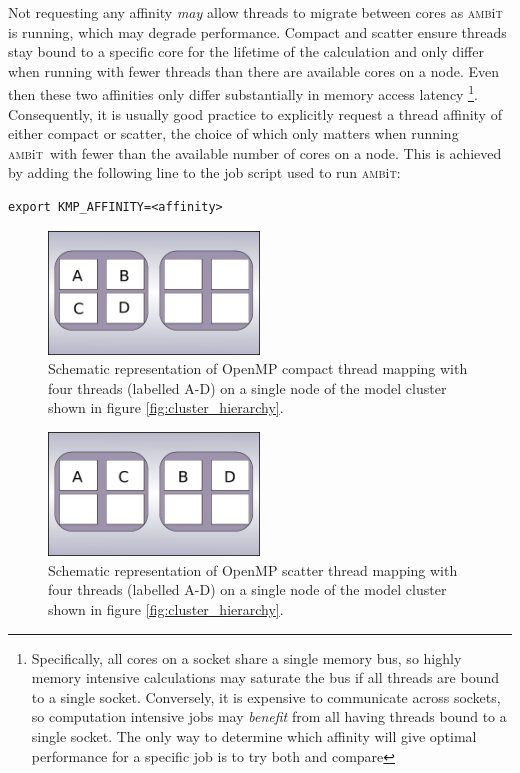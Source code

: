 \documentclass{report}
\newcommand{\ambit}{\textsc{amb}{\footnotesize i}\textsc{t}}
\begin{document}
Not requesting any affinity \emph{may} allow threads to migrate between cores as \ambit ~
is running, which may degrade performance. Compact and scatter ensure threads stay bound to a specific
core for the lifetime of the calculation and only differ when running with fewer 
threads than there are available cores on a node. Even then these two affinities only differ 
substantially in memory access latency \footnote{Specifically, all cores on a
socket share a single memory bus, so highly memory intensive calculations may saturate the bus if all
threads are bound to a single socket. Conversely, it is expensive to communicate across sockets, so
computation intensive jobs may \emph{benefit} from all having threads bound to a single socket. The only
way to determine which affinity will give optimal performance for a specific job is to try both and 
compare}. Consequently, it is usually good practice to explicitly request a thread affinity of either 
compact or scatter, the choice of which only matters when running \ambit ~with fewer than the available
number of cores on a node. This is achieved by adding the following line to the job script used to run
\ambit:

\begin{verbatim}
export KMP_AFFINITY=<affinity>
\end{verbatim}

\begin{figure}
\includegraphics[width=0.5\textwidth]{omp_compact.pdf}
\caption{Schematic representation of OpenMP compact thread mapping with four threads (labelled A-D) on
a single node of the model cluster shown in figure \ref{fig:cluster_hierarchy}.}
\label{fig:omp_compact}
\end{figure}

\begin{figure}
\includegraphics[width=0.5\textwidth]{omp_scatter.pdf}
\caption{Schematic representation of OpenMP scatter thread mapping with four threads (labelled A-D) on
a single node of the model cluster shown in figure \ref{fig:cluster_hierarchy}.}
\label{fig:omp_scatter}
\end{figure}
\end{document}
